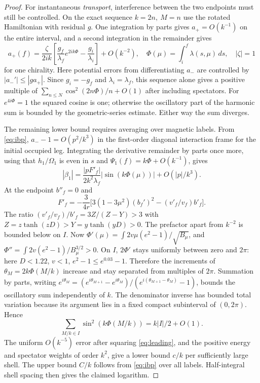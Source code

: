 \begin{proof}
For instantaneous \emph{transport}, interference between the two endpoints must still be controlled. On the exact sequence $k=2n,\ M=n$ use the rotated Hamiltonian with residual $g$. One integration by parts gives $a_+=O(k^{-1})$ on the entire interval, and a second integration in the remainder gives
\[
 a_+(f)=\frac{\zeta}{2ik}\left[\frac{g_f}{\lambda_f}e^{2ik\Phi}
                 -\frac{g_i}{\lambda_i}\right]+O(k^{-2}),
 \quad \Phi(\mu)=\int_i^f\lambda(s,\mu)\,ds,\quad |\zeta|=1
\]
for one chirality. Here potential errors from differentiating $a_-$ are controlled by $|a_-'|\le|g a_+|$. Since $g_i=-g_f$ and $\lambda_i=\lambda_f$, this sequence alone gives a positive multiple of $\sum_{n\le N}\cos^2(2n\Phi)/n+O(1)$ after including spectators. For $e^{4i\Phi}=1$ the squared cosine is one; otherwise the oscillatory part of the harmonic sum is bounded by the geometric-series estimate. Either way the sum diverges.

The remaining lower bound requires averaging over magnetic labels. From \eqref{eq:ibp}, $a_--1=O(p^2/k^3)$ in the first-order diagonal interaction frame for the initial occupied leg. Integrating the derivative remainder by parts once more, using that $h_1/\Omega_1$ is even in $s$ and $\Psi_1(f)=k\Phi+O(k^{-1})$, gives
\begin{equation}
 |\beta_1|=\frac{|p F'_f|}{2k^2\lambda_f}|\sin(k\Phi(\mu))|
                  + O(|p|/k^3).                               \label{eq:leading}
\end{equation}
At the endpoint $b''_f=0$ and
\[
 F'_f=-\frac{3}{4r}\big[3(1-3\mu^2)(b_f')^2-(v'_f/v_f)b'_f\big].
\]
The ratio $(v'_f/v_f)/b'_f=3Z/(Z-Y)>3$ with $Z=z\tanh(zD)>Y=y\tanh(yD)>0$. The prefactor apart from $k^{-2}$ is bounded below on $I$. Now $\Phi'(\mu)=\int 2v\mu(e^2-1)/\sqrt{B_\mu}$, and $\Phi''=\int 2v(e^2-1)/B_\mu^{3/2}>0$. On $I$, $2\Phi'$ stays uniformly between zero and $2\pi$: here $D<1.22$, $v<1$, $e^2-1\le e^{0.03}-1$. Therefore the increments of $\theta_M=2k\Phi(M/k)$ increase and stay separated from multiples of $2\pi$. Summation by parts, writing $e^{i\theta_M}=(e^{i\theta_{M+1}}-e^{i\theta_M})/(e^{i(\theta_{M+1}-\theta_M)}-1)$, bounds the oscillatory sum independently of $k$. The denominator inverse has bounded total variation because its argument lies in a fixed compact subinterval of $(0,2\pi)$. Hence
\[
 \sum_{M/k\in I}\sin^2(k\Phi(M/k))=k|I|/2+O(1).
\]
The uniform $O(k^{-5})$ error after squaring \eqref{eq:leading}, and the positive energy and spectator weights of order $k^2$, give a lower bound $c/k$ per sufficiently large shell. The upper bound $C/k$ follows from \eqref{eq:ibp} over all labels. Half-integral shell spacing then gives the claimed logarithm.
\end{proof}
